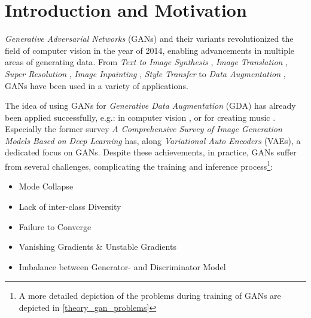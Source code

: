 \section{Introduction and Motivation}\label{introduction_and_motivation}
\pagestyle{fancy}
\textit{Generative Adversarial Networks} (GANs) \cite{goodfellow2014generativeadversarialnetworks} and their variants revolutionized the field of computer vision in the year of 2014, enabling advancements in multiple areas of generating data. From \textit{Text to Image Synthesis} \cite{reed2016generativeadversarialtextimage}, \textit{Image Translation} \cite{isola2018imagetoimagetranslationconditionaladversarial}, \textit{Super Resolution} \cite{ledig2017photorealisticsingleimagesuperresolution}, \textit{Image Inpainting} \cite{pathak2016contextencodersfeaturelearning}, \textit{Style Transfer} \cite{wang2023multimodalityguidedimagestyletransfer} to \textit{Data Augmentation} \cite{shorten2019survey}, GANs have been used in a variety of applications.

The idea of using GANs for \textit{Generative Data Augmentation} (GDA) has already been applied successfully, e.g.: in computer vision \cite{Li2025comprehensivesurvedeepimages}, \cite{biswas2023generativeadversarialnetworksdata} or for creating music \cite{ji2020comprehensivesurveydeepmusic}. Especially the former survey \textit{A Comprehensive Survey of Image Generation Models Based on Deep Learning} has, along \textit{Variational Auto Encoders} (VAEs), a dedicated focus on GANs. Despite these achievements, in practice, GANs suffer from several challenges, complicating the training and inference process\footnote{A more detailed depiction of the problems during training of GANs are depicted in \ref{theory_gan_problems}}:

\begin{itemize}\label{problems_of_gans}
    \setlength{\itemsep}{-5pt}
    \item Mode Collapse
    \item Lack of inter-class Diversity
    \item Failure to Converge
    \item Vanishing Gradients \& Unstable Gradients
    \item Imbalance between Generator- and Discriminator Model
\end{itemize} 

